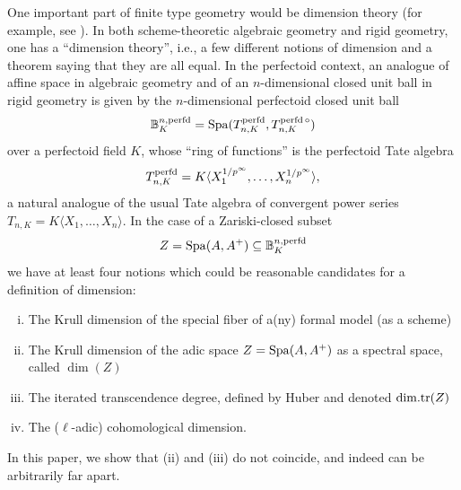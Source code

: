 One important part of finite type geometry would be dimension theory (for example, see
\cite[Problem~I.11.1]{fargues-scholze-2021-geometrization}). In both scheme-theoretic algebraic geometry
and rigid geometry, one has a ``dimension theory'', i.e., a few different notions of dimension and
a theorem saying that they are all equal. In the perfectoid context, an analogue of affine space in
algebraic geometry and of an $n$-dimensional closed unit ball in rigid geometry is given by the
$n$-dimensional perfectoid closed unit ball \begin{equation*}\mathbb{B}_{K}^{n,\operatorname{perfd}}=\operatorname{Spa}(T_{n,
    K}^{\operatorname{perfd}}, T_{n, K}^{\operatorname{perfd}\circ})\end{equation*}over a perfectoid field $K$, whose ``ring of
    functions'' is the perfectoid Tate algebra \begin{equation*}T_{n, K}^{\operatorname{perfd}}=K\langle
        X_{1}^{1/p^{\infty}},\dots, X_{n}^{1/p^{\infty}}\rangle,\end{equation*}a natural analogue of
        the usual Tate algebra of convergent power series $T_{n, K}=K\langle X_{1},\dots,
        X_{n}\rangle$. In the case of a Zariski-closed subset \begin{equation*}Z=\operatorname{Spa}(A,
        A^{+})\subseteq \mathbb{B}_{K}^{n,\operatorname{perfd}}\end{equation*}we have at least four notions which
        could be reasonable candidates for a definition of dimension:
        
\begin{enumerate}[(i)]
    \item The Krull dimension of the special fiber of a(ny) formal model (as a scheme)
    \item The Krull dimension of the adic space \(Z=\operatorname{Spa}(A, A^{+})\) as a spectral space, called
        \(\dim(Z)\)
    \item The iterated transcendence degree, defined by Huber and denoted \(\mathrm{dim.tr}(Z)\)
    \item The ($\ell$-adic) cohomological dimension.
\end{enumerate}

In this paper, we show that (ii) and (iii) do not coincide, and indeed can be arbitrarily far apart.


